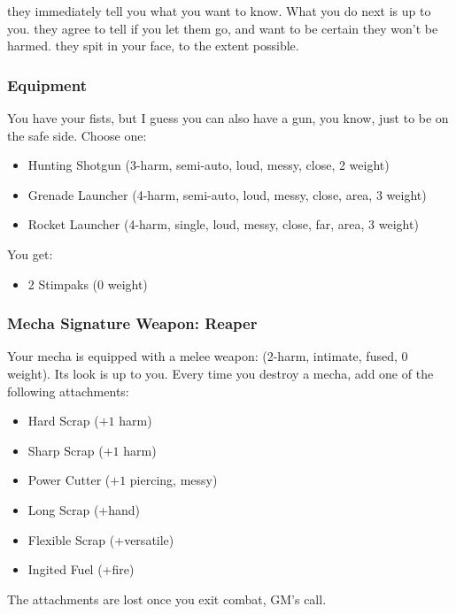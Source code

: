 
{they immediately tell you what you want to know. What you do next is up to you.}
{they agree to tell if you let them go, and want to be certain they won't be harmed.}
{they spit in your face, to the extent possible.}


\subsubsection{Equipment}
You have your fists, but I guess you can also have a gun, you know, just to be on the safe side. Choose one:
\begin{itemize}
\item Hunting Shotgun (3-harm, semi-auto, loud, messy, close, 2 weight)
\item Grenade Launcher (4-harm, semi-auto, loud, messy, close, area, 3 weight)
\item Rocket Launcher (4-harm, single, loud, messy, close, far, area, 3 weight)
\end{itemize}

You get:
\begin{itemize}
\item 2 Stimpaks (0 weight)
\end{itemize}

\subsubsection{Mecha Signature Weapon: Reaper}
Your mecha is equipped with a melee weapon: (2-harm, intimate, fused, 0 weight). Its look is up to you.
Every time you destroy a mecha, add one of the following attachments:
\begin{itemize}
\item Hard Scrap ($+1$ harm)
\item Sharp Scrap ($+1$ harm)
\item Power Cutter ($+1$ piercing, messy)
\item Long Scrap (+hand)
\item Flexible Scrap (+versatile)
\item Ingited Fuel (+fire)
\end{itemize}
The attachments are lost once you exit combat, GM's call.

